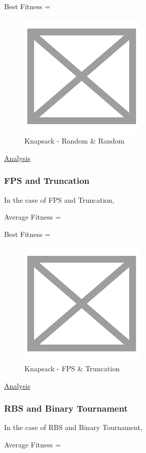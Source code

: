 \documentclass[11pt, letterpaper]{article}
\begin{document}
Best Fitness = 
\begin{figure}[H]
    \centering
    \includegraphics[scale = 0.6]{images/placeHolder.png}
    \caption {Knapsack - Random \& Random}
    \label {fig:tpsRR}
\end{figure}

\underline{Analysis}
\subsubsection {FPS and Truncation}
In the case of FPS and Truncation,

Average Fitness = 

Best Fitness = 
\begin{figure}[H]
    \centering
    \includegraphics[scale = 0.6]{images/placeHolder.png}
    \caption {Knapsack - FPS \& Truncation}
    \label {fig:tpsFT}
\end{figure}

\underline{Analysis}
\subsubsection {RBS and Binary Tournament}
In the case of RBS and Binary Tournament,

Average Fitness = 
\end{document}
